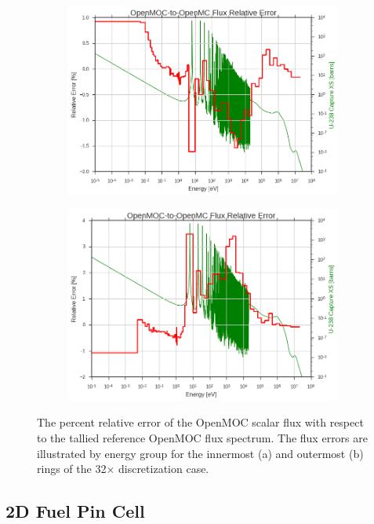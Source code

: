 \begin{figure}[h!]
\begin{subfigure}{\linewidth}
  \centering
  \includegraphics[width=0.9\linewidth]{figures/biases/slab/rel-err-fuel-inner}
  \caption{}
\end{subfigure}
\begin{subfigure}{\linewidth}
  \centering
  \includegraphics[width=0.9\linewidth]{figures/biases/slab/rel-err-fuel-outer}
  \caption{}
\end{subfigure}
\label{fig:chap2-slab-rel-err}
\caption[Flux relative error by group for a 1D slab.]{The percent relative error of the OpenMOC scalar flux with respect to the tallied reference OpenMOC flux spectrum. The flux errors are illustrated by energy group for the innermost (a) and outermost (b) rings of the 32$\times$ discretization case.}
\end{figure}


\subsection{2D Fuel Pin Cell}
\label{subsec:chap4-pin}

